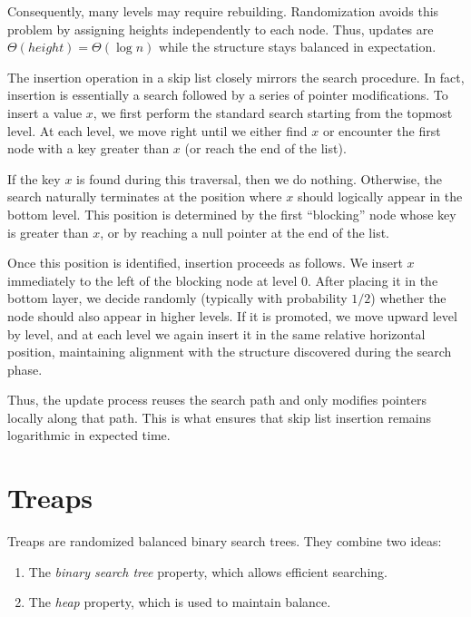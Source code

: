 \noindent Consequently, many levels may require rebuilding. Randomization avoids 
this problem by assigning heights independently to each node. Thus, updates are 
$\Theta(height)=\Theta(\log n)$ while the structure stays balanced in expectation.

The insertion operation in a skip list closely mirrors the search procedure. 
In fact, insertion is essentially a search followed by a series of pointer modifications. To insert a value \(x\), we first perform the standard search starting 
from the topmost level. At each level, we move right until we either find \(x\) or encounter 
the first node with a key greater than \(x\) (or reach the end of the list).

If the key \(x\) is found during this traversal, then we do nothing. Otherwise, the 
search naturally terminates at the position where \(x\) should logically appear 
in the bottom level. This position is determined by the first “blocking” node 
whose key is greater than \(x\), or by reaching a null pointer at the end of the list.

Once this position is identified, insertion proceeds as follows. We insert \(x\) immediately to the left of the blocking node at level 
\(0\). After placing it in the bottom layer, we decide randomly (typically 
with probability \(1/2\)) whether the node should also appear 
in higher levels. If it is promoted, we move upward level by level, and 
at each level we again insert it in the same relative horizontal position, 
maintaining alignment with the structure discovered during the search phase.

Thus, the update process reuses the search path and only modifies pointers locally 
along that path. This is what ensures that skip list insertion remains logarithmic in expected time.








\section{Treaps}

Treaps are randomized balanced binary search trees. They combine two ideas:

\begin{enumerate}
\item The \emph{binary search tree} property, which allows efficient searching.
\item The \emph{heap} property, which is used to maintain balance.
\end{enumerate}

